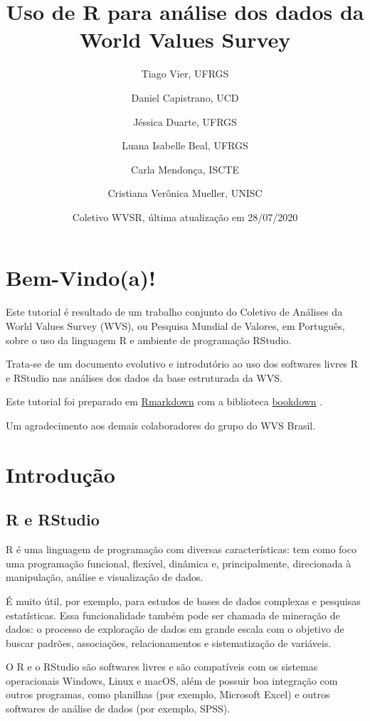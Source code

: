 \documentclass[
  10pt,
  brazil,
  a4paper,
  twoside, notitlepage, openright]{book}
\title{Uso de R para análise dos dados da World Values Survey}
\author{Tiago Vier, UFRGS \and Daniel Capistrano, UCD \and Jéssica Duarte, UFRGS \and Luana Isabelle Beal, UFRGS \and Carla Mendonça, ISCTE \and Cristiana Verônica Mueller, UNISC}
\date{Coletivo WVSR, última atualização em 28/07/2020}
\begin{document}
\maketitle

{
\setcounter{tocdepth}{1}
\tableofcontents
}
\hypertarget{bem-vindoa}{%
\chapter*{Bem-Vindo(a)!}\label{bem-vindoa}}

Este tutorial é resultado de um trabalho conjunto do Coletivo de Análises da World Values Survey (WVS), ou Pesquisa Mundial de Valores, em Português, sobre o uso da linguagem R e ambiente de programação RStudio.

Trata-se de um documento evolutivo e introdutório ao uso dos softwares livres R e RStudio nas análises dos dados da base estruturada da WVS.

Este tutorial foi preparado em \href{https://rmarkdown.rstudio.com/}{Rmarkdown} \citeyearpar{R-rmarkdown} com a biblioteca \href{https://bookdown.org/}{bookdown} \citeyearpar{R-bookdown}.

Um agradecimento aos demais colaboradores do grupo do WVS Brasil.

\hypertarget{intro}{%
\chapter{Introdução}\label{intro}}

\hypertarget{r-e-rstudio}{%
\section{R e RStudio}\label{r-e-rstudio}}

R é uma linguagem de programação com diversas características: tem como foco uma programação funcional, flexível, dinâmica e, principalmente, direcionada à manipulação, análise e visualização de dados.

É muito útil, por exemplo, para estudos de bases de dados complexas e pesquisas estatísticas. Essa funcionalidade também pode ser chamada de mineração de dados: o processo de exploração de dados em grande escala com o objetivo de buscar padrões, associações, relacionamentos e sistematização de variáveis.

O R e o RStudio são softwares livres e são compatíveis com os sistemas operacionais Windows, Linux e macOS, além de possuir boa integração com outros programas, como planilhas (por exemplo, Microsoft Excel) e outros softwares de análise de dados (por exemplo, SPSS).
\end{document}
